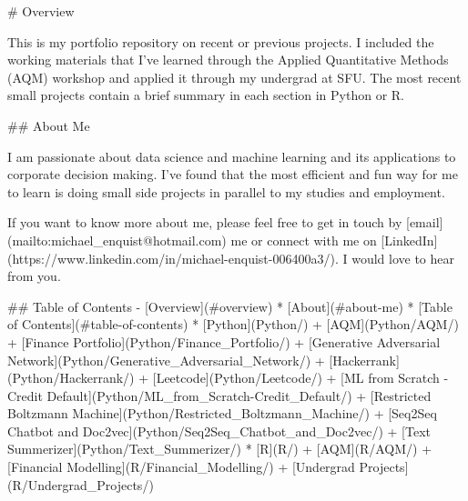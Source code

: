 # Overview

This is my portfolio repository on recent or previous projects. I included the working materials that I've learned through the Applied Quantitative Methods (AQM) workshop and applied it through my undergrad at SFU. The most recent small projects contain a brief summary in each section in Python or R.

## About Me

I am passionate about data science and machine learning and its applications to corporate decision making. I've found that the most efficient and fun way for me to learn is doing small side projects in parallel to my studies and employment.

If you want to know more about me, please feel free to get in touch by [email](mailto:michael_enquist@hotmail.com) me or connect with me on [LinkedIn](https://www.linkedin.com/in/michael-enquist-006400a3/). I would love to hear from you.


## Table of Contents
- [Overview](#overview)
  * [About](#about-me)
  * [Table of Contents](#table-of-contents)
  * [Python](Python/)
    + [AQM](Python/AQM/)
    + [Finance Portfolio](Python/Finance_Portfolio/)
    + [Generative Adversarial Network](Python/Generative_Adversarial_Network/)
    + [Hackerrank](Python/Hackerrank/)
    + [Leetcode](Python/Leetcode/)
    + [ML from Scratch - Credit Default](Python/ML_from_Scratch-Credit_Default/)
    + [Restricted Boltzmann Machine](Python/Restricted_Boltzmann_Machine/)
    + [Seq2Seq Chatbot and Doc2vec](Python/Seq2Seq_Chatbot_and_Doc2vec/)
    + [Text Summerizer](Python/Text_Summerizer/)
   * [R](R/)
    + [AQM](R/AQM/)
    + [Financial Modelling](R/Financial_Modelling/)
    + [Undergrad Projects](R/Undergrad_Projects/)
   
